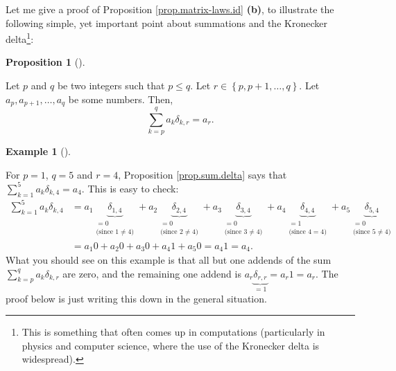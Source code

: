 \documentclass[numbers=enddot,12pt,final,onecolumn,notitlepage]{scrartcl}%
\theoremstyle{definition}
\newtheorem{prop}[theo]{Proposition}
\newenvironment{proposition}[1][]
{\begin{prop}[#1]\begin{leftbar}}
{\end{leftbar}\end{prop}}
\newtheorem{exam}[theo]{Example}
\newenvironment{example}[1][]
{\begin{exam}[#1]\begin{leftbar}}
{\end{leftbar}\end{exam}}
\let\sumnonlimits\sum
\renewcommand{\sum}{\sumnonlimits\limits}
\begin{document}
Let me give a proof of Proposition \ref{prop.matrix-laws.id} \textbf{(b)}, to
illustrate the following simple, yet important point about summations and the
Kronecker delta\footnote{This is something that often comes up in computations
(particularly in physics and computer science, where the use of the Kronecker
delta is widespread).}:

\begin{proposition}
\label{prop.sum.delta}Let $p$ and $q$ be two integers such that $p\leq q$. Let
$r\in\left\{  p,p+1,\ldots,q\right\}  $. Let $a_{p},a_{p+1},\ldots,a_{q}$ be
some numbers. Then,%
\[
\sum_{k=p}^{q}a_{k}\delta_{k,r}=a_{r}.
\]

\end{proposition}

\begin{example}
For $p=1$, $q=5$ and $r=4$, Proposition \ref{prop.sum.delta} says that
$\sum_{k=1}^{5}a_{k}\delta_{k,4}=a_{4}$. This is easy to check:%
\begin{align*}
\sum_{k=1}^{5}a_{k}\delta_{k,4}  &  =a_{1}\underbrace{\delta_{1,4}%
}_{\substack{=0\\\text{(since }1\neq4\text{)}}}+a_{2}\underbrace{\delta_{2,4}%
}_{\substack{=0\\\text{(since }2\neq4\text{)}}}+a_{3}\underbrace{\delta_{3,4}%
}_{\substack{=0\\\text{(since }3\neq4\text{)}}}+a_{4}\underbrace{\delta_{4,4}%
}_{\substack{=1\\\text{(since }4=4\text{)}}}+a_{5}\underbrace{\delta_{5,4}%
}_{\substack{=0\\\text{(since }5\neq4\text{)}}}\\
&  =a_{1}0+a_{2}0+a_{3}0+a_{4}1+a_{5}0=a_{4}1=a_{4}.
\end{align*}
What you should see on this example is that all but one addends of the sum
$\sum_{k=p}^{q}a_{k}\delta_{k,r}$ are zero, and the remaining one addend is
$a_{r}\underbrace{\delta_{r,r}}_{=1}=a_{r}1=a_{r}$. The proof below is just
writing this down in the general situation.
\end{example}
\end{document}
